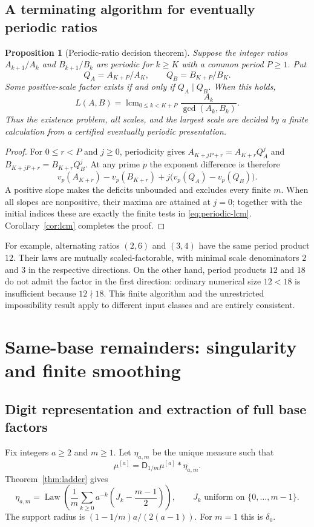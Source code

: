 \documentclass[11pt,a4paper]{article}
\newtheorem{proposition}[theorem]{Proposition}
\theoremstyle{definition}
\theoremstyle{remark}
\newcommand{\Law}{\operatorname{Law}}
\newcommand{\lcm}{\operatorname{lcm}}
\newcommand{\D}{\mathsf D}
\newcommand{\Mu}[1]{\mu^{[#1]}}
\begin{document}
\subsection{A terminating algorithm for eventually periodic ratios}
\begin{proposition}[Periodic-ratio decision theorem]\label{prop:periodic}
Suppose the integer ratios $A_{k+1}/A_k$ and $B_{k+1}/B_k$ are periodic
for $k\ge K$ with a common period $P\ge1$. Put
\[
 Q_A=A_{K+P}/A_K,\qquad Q_B=B_{K+P}/B_K.
\]
Some positive-scale factor exists if and only if $Q_A\mid Q_B$.
When this holds,
\begin{equation}\label{eq:periodic-lcm}
 L(A,B)=\lcm_{0\le k<K+P}\frac{A_k}{\gcd(A_k,B_k)}.
\end{equation}
Thus the existence problem, all scales, and the largest scale are decided
by a finite calculation from a certified eventually periodic presentation.
\end{proposition}
\begin{proof}
For $0\le r<P$ and $j\ge0$, periodicity gives
$A_{K+jP+r}=A_{K+r}Q_A^j$ and
$B_{K+jP+r}=B_{K+r}Q_B^j$.
At any prime $p$ the exponent difference is therefore
\[
 v_p(A_{K+r})-v_p(B_{K+r})
   +j\bigl(v_p(Q_A)-v_p(Q_B)\bigr).
\]
A positive slope makes the deficits unbounded and excludes every finite
$m$. When all slopes are nonpositive, their maxima are attained at $j=0$;
together with the initial indices these are exactly the finite tests in
\eqref{eq:periodic-lcm}. Corollary~\ref{cor:lcm} completes the proof.
\end{proof}

For example, alternating ratios $(2,6)$ and $(3,4)$ have the same period
product $12$. Their laws are mutually scaled-factorable, with minimal
scale denominators $2$ and $3$ in the respective directions. On the other
hand, period products $12$ and $18$ do not admit the factor in the first
direction: ordinary numerical size $12<18$ is insufficient because
$12\nmid18$. This finite algorithm and the unrestricted impossibility
result apply to different input classes and are entirely consistent.

\section{Same-base remainders: singularity and finite smoothing}
\label{sec:regularity}

\subsection{Digit representation and extraction of full base factors}
Fix integers $a\ge2$ and $m\ge1$. Let $\eta_{a,m}$ be the unique measure
such that
\begin{equation}\label{eq:same-base}
 \Mu a=\D_{1/m}\Mu a*\eta_{a,m}.
\end{equation}
Theorem~\ref{thm:ladder} gives
\begin{equation}\label{eq:same-digits}
 \eta_{a,m}=\Law\left(\frac1m\sum_{k\ge0}a^{-k}
       \left(J_k-\frac{m-1}{2}\right)\right),
 \qquad J_k\text{ uniform on }\{0,\ldots,m-1\}.
\end{equation}
The support radius is $(1-1/m)a/(2(a-1))$. For $m=1$ this is $\delta_0$.
\end{document}
